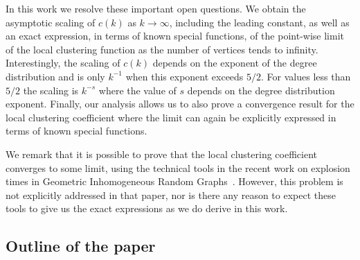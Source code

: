 In this work we resolve these important open questions. We obtain the asymptotic scaling of $c(k)$ as $k \to \infty$, including the leading constant, as well as an exact expression, in terms of known special functions, of the point-wise limit of the local clustering function as the number of vertices tends to infinity. Interestingly, the scaling of $c(k)$ depends on the exponent of the degree distribution and is only $k^{-1}$ when this exponent exceeds $5/2$. For values less than $5/2$ the scaling is $k^{-s}$ where the value of $s$ depends on the degree distribution exponent. Finally, our analysis allows us to also prove a convergence result for the local clustering coefficient where the limit can again be explicitly expressed in terms of known special functions. 

We remark that it is possible to prove that the local clustering coefficient converges to some limit, using the technical tools in the recent work on explosion times in Geometric Inhomogeneous Random Graphs~\cite{komjathy2018explosion}. However, this problem is not explicitly addressed in that paper, nor is there any reason to expect these tools to give us the exact expressions as we do derive in this work.



\subsection{Outline of the paper}

